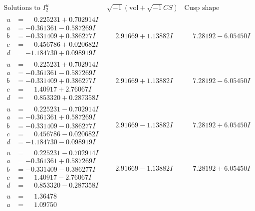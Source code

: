 \documentclass[1p]{elsarticle_modified}
\theoremstyle{definition}
\newcommand{\I}{\sqrt{-1}}
\begin{document}
$$\begin{array}{c|c|c}  
\text{Solutions to }I^u_{2}& \I (\text{vol} + \sqrt{-1}CS) & \text{Cusp shape}\\
 \hline 
\begin{aligned}
u &= \phantom{-}0.225231 + 0.702914 I \\
a &= -0.361361 - 0.587269 I \\
b &= -0.331409 + 0.386277 I \\
c &= \phantom{-}0.456786 + 0.020682 I \\
d &= -1.184730 + 0.098919 I\end{aligned}
 & \phantom{-}2.91669 + 1.13882 I & \phantom{-}7.28192 - 6.05450 I \\ \hline\begin{aligned}
u &= \phantom{-}0.225231 + 0.702914 I \\
a &= -0.361361 - 0.587269 I \\
b &= -0.331409 + 0.386277 I \\
c &= \phantom{-}1.40917 + 2.76067 I \\
d &= \phantom{-}0.853320 + 0.287358 I\end{aligned}
 & \phantom{-}2.91669 + 1.13882 I & \phantom{-}7.28192 - 6.05450 I \\ \hline\begin{aligned}
u &= \phantom{-}0.225231 - 0.702914 I \\
a &= -0.361361 + 0.587269 I \\
b &= -0.331409 - 0.386277 I \\
c &= \phantom{-}0.456786 - 0.020682 I \\
d &= -1.184730 - 0.098919 I\end{aligned}
 & \phantom{-}2.91669 - 1.13882 I & \phantom{-}7.28192 + 6.05450 I \\ \hline\begin{aligned}
u &= \phantom{-}0.225231 - 0.702914 I \\
a &= -0.361361 + 0.587269 I \\
b &= -0.331409 - 0.386277 I \\
c &= \phantom{-}1.40917 - 2.76067 I \\
d &= \phantom{-}0.853320 - 0.287358 I\end{aligned}
 & \phantom{-}2.91669 - 1.13882 I & \phantom{-}7.28192 + 6.05450 I \\ \hline\begin{aligned}
u &= \phantom{-}1.36478\phantom{ +0.000000I} \\
a &= \phantom{-}1.09750\phantom{ +0.000000I} \\

\end{aligned}
\end{array}$$
\end{document}
